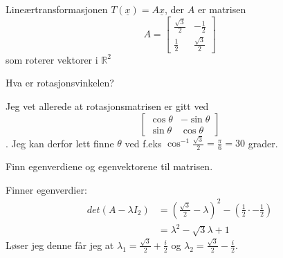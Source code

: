 \documentclass[11pt, a4paper, norsk]{NTNUoving}
\begin{document}
    \begin{oppgave}
        Lineærtransformasjonen $T(\underline{x}) = A\underline{x}$, der $A$ er matrisen $$A = \begin{bmatrix}
            \frac{\sqrt{3}}{2} & -\frac{1}{2} \\
            \frac{1}{2} & \frac{\sqrt{3}}{2}
        \end{bmatrix}$$ som roterer vektorer i $\mathbb{R}^{2}$

        \begin{punkt}
            Hva er rotasjonsvinkelen?

            Jeg vet allerede at rotasjonsmatrisen er gitt ved $$\begin{bmatrix}
                \cos{\theta} & -\sin{\theta} \\
                \sin{\theta} & \cos{\theta}
            \end{bmatrix}$$. Jeg kan derfor lett finne $\theta$ ved f.eks $\cos^{-1}{\frac{\sqrt{3}}{2}} = \frac{\pi}{6} = 30$ grader. 
        \end{punkt}
        \begin{punkt}
            Finn egenverdiene og egenvektorene til matrisen.

            Finner egenverdier:
            \begin{align*}
                det(A - \lambda I_{2}) &= (\frac{\sqrt{3}}{2} - \lambda)^2 - (\frac{1}{2} \cdot -\frac{1}{2}) \\
                                       &= \lambda^2 -\sqrt{3}\lambda + 1
            \end{align*}
            Løser jeg denne får jeg at $\lambda_1 = \frac{\sqrt{3}}{2} + \frac{i}{2}$ og $\lambda_2 = \frac{\sqrt{3}}{2} - \frac{i}{2}$.


\end{punkt}
\end{oppgave}
\end{document}

